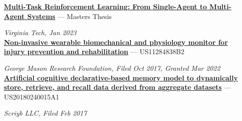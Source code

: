 
\href{https://vtechworks.lib.vt.edu/items/bcd82abe-909b-4b69-9313-caa6b431e45b}{\textbf{Multi-Task Reinforcement Learning: From Single-Agent to Multi-Agent Systems}} --- Masters Thesis

\textit{Virginia Tech, Jan 2023} \\


\href{https://patents.google.com/patent/US11284838B2/en?inventor=matthew+trang&oq=matthew+trang}{\textbf{Non-invasive wearable biomechanical and physiology monitor for injury prevention and rehabilitation}} --- US11284838B2

\textit{George Mason Research Foundation, Filed Oct 2017, Granted Mar 2022} \\

\href{https://patents.google.com/patent/US20180240015A1/en?inventor=Matthew+Luu+Trang}{\textbf{Artificial cognitive declarative-based memory model to dynamically store, retrieve, and recall data derived from aggregate datasets}} --- US20180240015A1

\textit{Scriyb LLC, Filed Feb 2017} \\


